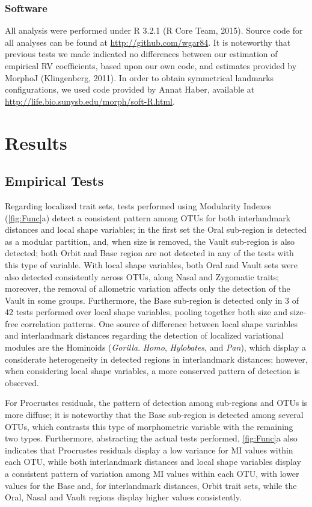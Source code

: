 \documentclass[12pt,]{article}
\begin{document}
\subsubsection{Software}\label{software}

All analysis were performed under R 3.2.1 (R Core Team, 2015). Source
code for all analyses can be found at \url{http://github.com/wgar84}. It
is noteworthy that previous tests we made indicated no differences
between our estimation of empirical RV coefficients, based upon our own
code, and estimates provided by MorphoJ (Klingenberg, 2011). In order to
obtain symmetrical landmarks configurations, we used code provided by
Annat Haber, available at
\url{http://life.bio.sunysb.edu/morph/soft-R.html}.

\section{Results}\label{results}

\subsection{Empirical Tests}\label{empirical-tests}

Regarding localized trait sets, tests performed using Modularity Indexes
(\autoref{fig:Func}a) detect a consistent pattern among OTUs for both
interlandmark distances and local shape variables; in the first set the
Oral sub-region is detected as a modular partition, and, when size is
removed, the Vault sub-region is also detected; both Orbit and Base
region are not detected in any of the tests with this type of variable.
With local shape variables, both Oral and Vault sets were also detected
consistently across OTUs, along Nasal and Zygomatic traits; moreover,
the removal of allometric variation affects only the detection of the
Vault in some groups. Furthermore, the Base sub-region is detected only
in 3 of 42 tests performed over local shape variables, pooling together
both size and size-free correlation patterns. One source of difference
between local shape variables and interlandmark distances regarding the
detection of localized variational modules are the Hominoids
(\emph{Gorilla}. \emph{Homo}, \emph{Hylobates}, and \emph{Pan}), which
display a considerate heterogeneity in detected regions in interlandmark
distances; however, when considering local shape variables, a more
conserved pattern of detection is observed.

For Procrustes residuals, the pattern of detection among sub-regions and
OTUs is more diffuse; it is noteworthy that the Base sub-region is
detected among several OTUs, which contrasts this type of morphometric
variable with the remaining two types. Furthermore, abstracting the
actual tests performed, \autoref{fig:Func}a also indicates that
Procrustes residuals display a low variance for MI values within each
OTU, while both interlandmark distances and local shape variables
display a consistent pattern of variation among MI values within each
OTU, with lower values for the Base and, for interlandmark distances,
Orbit trait sets, while the Oral, Nasal and Vault regions display higher
values consistently.
\end{document}
